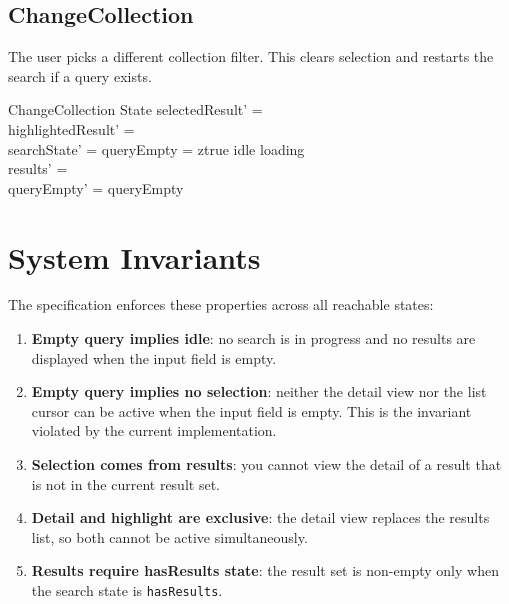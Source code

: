 \documentclass[a4paper,10pt,fleqn]{article}
\begin{document}
\subsection{ChangeCollection}

The user picks a different collection filter. This clears selection and
restarts the search if a query exists.

\begin{schema}{ChangeCollection}
  \Delta State
  \where
  selectedResult' = \emptyset \\
  highlightedResult' = \emptyset \\
  searchState' = \IF queryEmpty = ztrue \THEN idle \ELSE loading \\
  results' = \emptyset \\
  queryEmpty' = queryEmpty
\end{schema}

\section{System Invariants}

The specification enforces these properties across all reachable states:

\begin{enumerate}
  \item \textbf{Empty query implies idle}: no search is in progress and no
    results are displayed when the input field is empty.
  \item \textbf{Empty query implies no selection}: neither the detail view
    nor the list cursor can be active when the input field is empty. This
    is the invariant violated by the current implementation.
  \item \textbf{Selection comes from results}: you cannot view the detail
    of a result that is not in the current result set.
  \item \textbf{Detail and highlight are exclusive}: the detail view
    replaces the results list, so both cannot be active simultaneously.
  \item \textbf{Results require hasResults state}: the result set is
    non-empty only when the search state is \texttt{hasResults}.
\end{enumerate}
\end{document}
